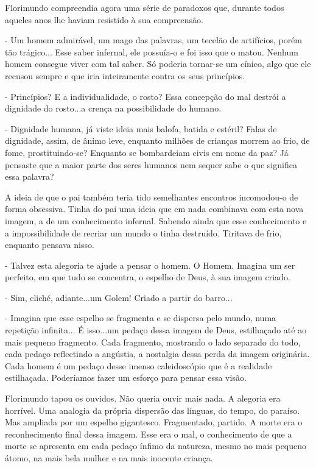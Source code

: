 Florimundo compreendia agora uma série de paradoxos que, durante todos
aqueles anos lhe haviam resistido à sua compreensão.

- Um homem admirável, um mago das palavras, um tecelão de artifícios,
porém tão trágico... Esse saber infernal, ele possuía-o e foi isso que o
matou. Nenhum homem consegue viver com tal saber. Só poderia tornar-se
um cínico, algo que ele recusou sempre e que iria inteiramente contra os
seus princípios.

- Princípios? E a individualidade, o rosto? Essa concepção do mal
destrói a dignidade do rosto...a crença na possibilidade do humano.

- Dignidade humana, já viste ideia mais balofa, batida e estéril? Falas
de dignidade, assim, de ânimo leve, enquanto milhões de crianças morrem
ao frio, de fome, prostituindo-se? Enquanto se bombardeiam civis em nome
da paz? Já pensaste que a maior parte dos seres humanos nem sequer sabe
o que significa essa palavra?

A ideia de que o pai também teria tido semelhantes encontros incomodou-o
de forma obsessiva. Tinha do pai uma ideia que em nada combinava com
esta nova imagem, a de um conhecimento infernal. Sabendo ainda que esse
conhecimento e a impossibilidade de recriar um mundo o tinha destruído.
Tiritava de frio, enquanto pensava nisso.

- Talvez esta alegoria te ajude a pensar o homem. O Homem. Imagina um
ser perfeito, em que tudo se concentra, o espelho de Deus, à sua imagem
criado.

- Sim, cliché, adiante...um Golem! Criado a partir do barro...

- Imagina que esse espelho se fragmenta e se dispersa pelo mundo, numa
repetição infinita... É isso...um pedaço dessa imagem de Deus,
estilhaçado até ao mais pequeno fragmento. Cada fragmento, mostrando o
lado separado do todo, cada pedaço reflectindo a angústia, a nostalgia
dessa perda da imagem originária. Cada homem é um pedaço desse imenso
caleidoscópio que é a realidade estilhaçada. Poderíamos fazer um esforço
para pensar essa visão.

Florimundo tapou os ouvidos. Não queria ouvir mais nada. A alegoria era
horrível. Uma analogia da própria dispersão das línguas, do tempo, do
paraíso. Mas ampliada por um espelho gigantesco. Fragmentado, partido. A
morte era o reconhecimento final dessa imagem. Esse era o mal, o
conhecimento de que a morte se apresenta em cada pedaço ínfimo da
natureza, mesmo no mais pequeno átomo, na mais bela mulher e na mais
inocente criança.

